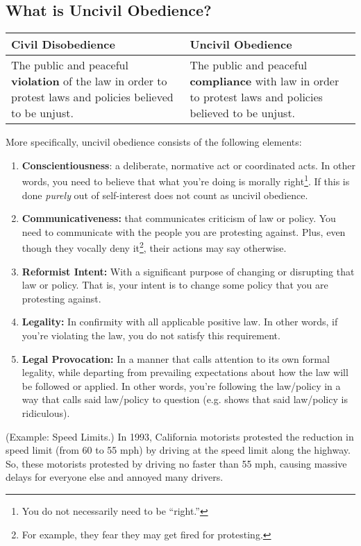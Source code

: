 \documentclass[letterpaper]{article}
\begin{document}
\subsection{What is Uncivil Obedience?}
\begin{center}
    \begin{tabular}{p{3in}|p{3in}}
        \textbf{Civil Disobedience} & \textbf{Uncivil Obedience} \\ 
        \hline 
        The public and peaceful \textbf{violation} of the law in order to protest laws and policies believed to be unjust. & The public and peaceful \textbf{compliance} with law in order to protest laws and policies believed to be unjust.
    \end{tabular}
\end{center} 
More specifically, uncivil obedience consists of the following elements:  
\begin{enumerate}
    \item \textbf{Conscientiousness}: a deliberate, normative act or coordinated acts. In other words, you need to believe that what you're doing is morally right\footnote{You do not necessarily need to be ``right.''}. If this is done \emph{purely} out of self-interest does not count as uncivil obedience. 
    \item \textbf{Communicativeness:} that communicates criticism of law or policy. You need to communicate with the people you are protesting against. Plus, even though they vocally deny it\footnote{For example, they fear they may get fired for protesting.}, their actions may say otherwise.
    \item \textbf{Reformist Intent:} With a significant purpose of changing or disrupting that law or policy. That is, your intent is to change some policy that you are protesting against. 
    \item \textbf{Legality:} In confirmity with all applicable positive law. In other words, if you're violating the law, you do not satisfy this requirement. 
    \item \textbf{Legal Provocation:} In a manner that calls attention to its own formal legality, while departing from prevailing expectations about how the law will be followed or applied. In other words, you're following the law/policy in a way that calls said law/policy to question (e.g. shows that said law/policy is ridiculous).
\end{enumerate}

\begin{mdframed}[]
    (Example: Speed Limits.) In 1993, California motorists protested the reduction in speed limit (from 60 to 55 mph) by driving at the speed limit along the highway. So, these motorists protested by driving no faster than 55 mph, causing massive delays for everyone else and annoyed many drivers. 
\end{mdframed}
\end{document}
